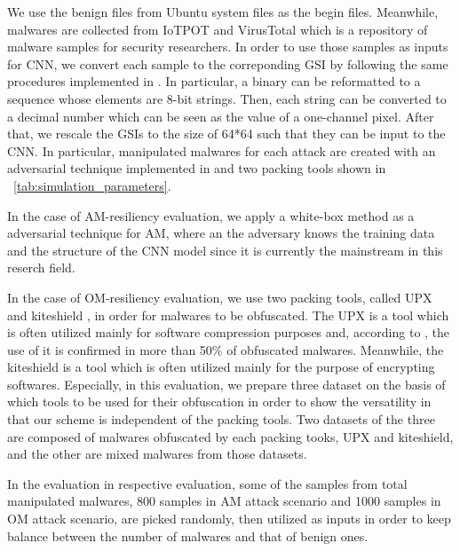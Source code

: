 We use the benign files from Ubuntu system files \cite{ubuntu} as the begin files.
Meanwhile, malwares are collected from IoTPOT \cite{iotpot} and VirusTotal \cite{virustotal} which is a repository of malware samples for security researchers.
In order to use those samples as inputs for CNN, we convert each sample to the correponding GSI by following the same procedures implemented in \cite{previous}.
In particular, a binary can be reformatted to a sequence whose elements are 8-bit strings.
Then, each string can be converted to a decimal number which can be seen as the value of a one-channel pixel.
After that, we rescale the GSIs to the size of 64*64 such that they can be input to the CNN.
In particular, manipulated malwares for each attack are created with an adversarial technique implemented in \cite{am, yamafumi} and two packing tools \cite{upx, kiteshield} shown in \tablename~\ref{tab:simulation_parameters}.

In the case of AM-resiliency evaluation, we apply a white-box method as a adversarial technique for AM, where an the adversary knows the training data and the structure of the CNN model since it is currently the mainstream in this reserch field.

In the case of OM-resiliency evaluation, we use two packing tools, called UPX \cite{upx} and kiteshield \cite{kiteshield}, in order for malwares to be obfuscated.
The UPX is a tool which is often utilized mainly for software compression purposes and, according to \cite{pack_research}, the use of it is confirmed in more than 50\% of obfuscated malwares. 
Meanwhile, the kiteshield is a tool which is often utilized mainly for the purpose of encrypting softwares.
Especially, in this evaluation, we prepare three dataset on the basis of which tools to be used for their obfuscation in order to show the versatility in that our scheme is independent of the packing tools.
Two datasets of the three are composed of malwares obfuscated by each packing tooks, UPX and kiteshield, and the other are mixed malwares from those datasets. 

In the evaluation in respective evaluation, some of the samples from total manipulated malwares, 800 samples in AM attack scenario and 1000 samples in OM attack scenario, are picked randomly, then utilized as inputs in order to keep balance between the number of malwares and that of benign ones.

